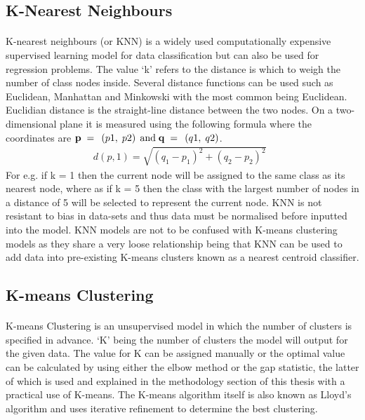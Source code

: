 \subsection{K-Nearest Neighbours}
\label{KNN}
\paragraph{}K-nearest neighbours (or KNN) is a widely used computationally expensive supervised learning model for data classification but can also be used for regression problems. The value ‘k' refers to the distance is which to weigh the number of class nodes inside. Several distance functions can be used such as Euclidean, Manhattan and Minkowski with the most common being Euclidean. Euclidian distance is the straight-line distance between the two nodes. On a two-dimensional plane it is measured using the following formula where the coordinates are 
${\bf{p}}{\rm{\;}} = {\rm{\;}}\left( {p1,{\rm{\;}}p2} \right){\rm{\;and\;}}{\bf{q}}{\rm{\;}} = {\rm{\;}}\left( {q1,{\rm{\;}}q2} \right)$.
\begin{align*}
d\left( {p,1} \right) = \sqrt {{{\left( {{q_1} - {p_1}} \right)}^2} + {{\left( {{q_2} - {p_2}} \right)}^2}} \;\;
\end{align*}
For e.g. if k = 1 then the current node will be assigned to the same class as its nearest node, where as if k = 5 then the class with the largest number of nodes in a distance of 5 will be selected to represent the current node. KNN is not resistant to bias in data-sets and thus data must be normalised before inputted into the model. KNN models are not to be confused with K-means clustering models as they share a very loose relationship being that KNN can be used to add data into pre-existing K-means clusters known as a nearest centroid classifier.
\subsection{K-means Clustering} 
\paragraph{}K-means Clustering is an unsupervised model in which the number of clusters is specified in advance. ‘K' being the number of clusters the model will output for the given data. The value for K can be assigned manually or the optimal value can be calculated by using either the elbow method or the gap statistic, the latter of which is used and explained in the methodology section of this thesis with a practical use of K-means. The K-means algorithm itself is also known as Lloyd's algorithm and uses iterative refinement to determine the best clustering.
